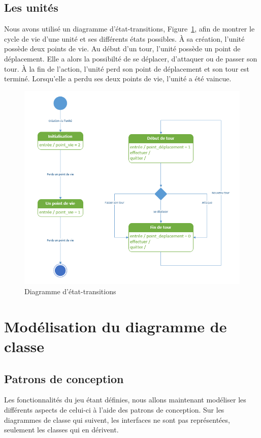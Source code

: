 \documentclass[a4paper]{article}%
\begin{document}
\subsection{Les unités}
Nous avons utilisé un diagramme d'état-transitions, Figure~\ref{fig:trans_unite}, afin de montrer le cycle de vie d'une unité et ses différents états possibles.
\`A sa création, l'unité possède deux points de vie. 
Au début d'un tour, l'unité possède un point de déplacement. Elle a alors la possibilté de se déplacer, d'attaquer ou de passer son tour. \`A la fin de l'action, l'unité perd son point de déplacement et son tour est terminé.
Lorsqu'elle a perdu ses deux points de vie, l'unité a été vaincue.

\begin{figure}[H]
    \centering
    \includegraphics[width=\textwidth]{./images/etat_transitions/cycle_unite.png}
		\caption{Diagramme d'état-transitions }
		\label{fig:trans_unite}
\end{figure}


\section{Modélisation du diagramme de classe}

\subsection{Patrons de conception}
Les fonctionnalités du jeu étant définies, nous allons maintenant modéliser les différents aspects de celui-ci à l'aide des patrons de conception. Sur les diagrammes de classe qui suivent, les interfaces ne sont pas représentées, seulement les classes qui en dérivent.
\end{document}
